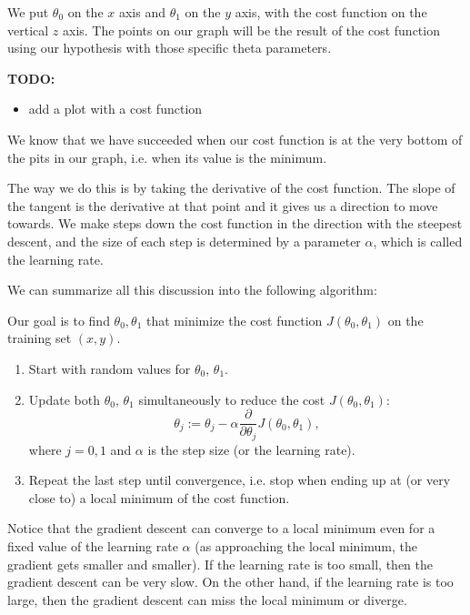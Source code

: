 \documentclass[a4paper,11pt]{report}
\begin{document}
We put $\theta_0$ on the $x$ axis and $\theta_1$ on the $y$ axis, with the cost function on the vertical $z$ axis. The points on our graph will be the result of the cost function using our hypothesis with those specific theta parameters.

\textbf{TODO:}
\begin{itemize}
  \item add a plot with a cost function
\end{itemize}

We know that we have succeeded when our cost function is at the very bottom of the pits in our graph, i.e. when its value is the minimum.

The way we do this is by taking the derivative of the cost function. The slope of the tangent is the derivative at that point and it gives us a direction to move towards. We make steps down the cost function in the direction with the steepest descent, and the size of each step is determined by a parameter $\alpha$, which is called the learning rate.

We can summarize all this discussion into the following algorithm:

Our goal is to find $\theta_0, \theta_1$ that minimize the cost function $J(\theta_0, \theta_1)$ on the training set $(x, y)$.

\begin{enumerate}
  \item Start with random values for $\theta_0$, $\theta_1$.
  \item Update both $\theta_0$, $\theta_1$ simultaneously to reduce the cost $J(\theta_0, \theta_1)$:
        \begin{equation}\label{eq:lin-reg-gd}
        \theta_j := \theta_j - \alpha \frac{\partial}{\partial \theta_j} J(\theta_0, \theta_1),
        \end{equation}
        where $j=0,1$ and $\alpha$ is the step size (or the learning rate).
  \item Repeat the last step until convergence, i.e. stop when ending up at (or very close to) a local minimum of the cost function.
\end{enumerate}

Notice that the gradient descent can converge to a local minimum even for a fixed value of the learning rate $\alpha$ (as approaching the local minimum, the gradient gets smaller and smaller).
If the learning rate is too small, then the gradient descent can be very slow. On the other hand, if the learning rate is too large, then the gradient descent can miss the local minimum or diverge.
\end{document}
